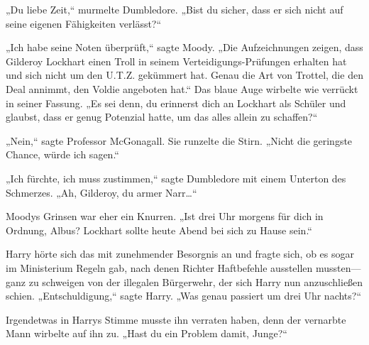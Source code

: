 „Du liebe Zeit,“ murmelte Dumbledore. „Bist du sicher, dass er sich nicht auf seine eigenen Fähigkeiten verlässt?“

„Ich habe seine Noten überprüft,“ sagte Moody. „Die Aufzeichnungen zeigen, dass Gilderoy Lockhart einen Troll in seinem Verteidigungs-Prüfungen erhalten hat und sich nicht um den U.T.Z. gekümmert hat. Genau die Art von Trottel, die den Deal annimmt, den Voldie angeboten hat.“ Das blaue Auge wirbelte wie verrückt in seiner Fassung. „Es sei denn, du erinnerst dich an Lockhart als Schüler und glaubst, dass er genug Potenzial hatte, um das alles allein zu schaffen?“

„Nein,“ sagte Professor McGonagall. Sie runzelte die Stirn. „Nicht die geringste Chance, würde ich sagen.“

„Ich fürchte, ich muss zustimmen,“ sagte Dumbledore mit einem Unterton des Schmerzes. „Ah, Gilderoy, du armer Narr…“

Moodys Grinsen war eher ein Knurren. „Ist drei Uhr morgens für dich in Ordnung, Albus? Lockhart sollte heute Abend bei sich zu Hause sein.“

Harry hörte sich das mit zunehmender Besorgnis an und fragte sich, ob es sogar im Ministerium Regeln gab, nach denen Richter Haftbefehle ausstellen mussten—ganz zu schweigen von der illegalen Bürgerwehr, der sich Harry nun anzuschließen schien.
„Entschuldigung,“ sagte Harry. „Was genau passiert um drei Uhr nachts?“

Irgendetwas in Harrys Stimme musste ihn verraten haben, denn der vernarbte Mann wirbelte auf ihn zu. „Hast du ein Problem damit, Junge?“

